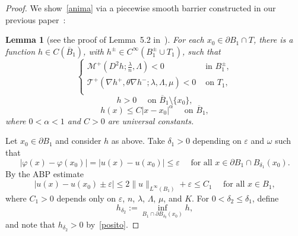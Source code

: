 \documentclass[letter,11pt]{amsart}
\newcommand{\vep}{\varepsilon}
\newcommand{\mcal}{\mathcal{M}}
\newcommand{\tcal}{\mathcal{T}}
\newtheorem{lem}[thm]{Lemma}
\theoremstyle{definition}
\numberwithin{equation}{section}
\begin{document}
\begin{proof}
We show~\eqref{anima} via a piecewise smooth barrier constructed in our previous paper~\cite{E}:

\begin{lem}[see the proof of Lemma~5.2 in~\cite{E}]
For each $x_0 \in \partial B_1 \cap T$, there is a function $h \in C(\overline{B}_1)$, with $h^{\pm} \in C^{\infty}(B_1^{\pm} \cup T_1)$,
such that
\begin{equation}
\label{thebar}
\begin{cases}
\mcal^{+}(D^2 h; \frac{\lambda}{n}, \Lambda) < 0 & \text{ in } B_1^{\pm},\\
\tcal^{+}(\nabla h^{+}, \theta \nabla h^{-}; \lambda, \Lambda, \mu) < 0 & \text{ on } T_1,\\
\end{cases}
\end{equation}
\begin{equation}
\label{posito}
h > 0 \quad \text{ on } \overline{B}_1 \setminus \{x_0\},
\end{equation}
\begin{equation}
\label{barthe}
h(x) \leq C |x-x_0|^{\alpha} \quad \text{ on } \overline{B}_1,
\end{equation}
where $0 < \alpha < 1$ and $C > 0$ are universal constants.
\end{lem}

\medskip

Let $x_0 \in \partial B_1$ and consider $h$ as above.
Take $\delta_1 > 0$ depending on $\vep$ and $\omega$ such that
\[
|\varphi(x) - \varphi(x_0)| = |u(x)- u(x_0)| \leq \vep \quad \text{ for all } x \in \partial B_1 \cap B_{\delta_1}(x_0).
\]
By the ABP estimate
\begin{equation}
\label{cos3}
|u(x) - u(x_0) \pm \vep| \leq 2 \|u\|_{L^{\infty}(B_1)} + \vep \leq C_1 \quad \text{ for all } x \in B_1,
\end{equation}
where $C_1 > 0$ depends only on $\vep$, $n$, $\lambda$, $\Lambda$, $\mu$, and $K$.
For $0 < \delta_2 \leq \delta_1$, define
\begin{equation}
\label{cos4}
h_{\delta_2} := \inf_{B_1 \cap \partial B_{\delta_2}(x_0)} h,
\end{equation}
and note that $h_{\delta_2} > 0$ by~\eqref{posito}.

\medskip


\end{proof}
\end{document}
